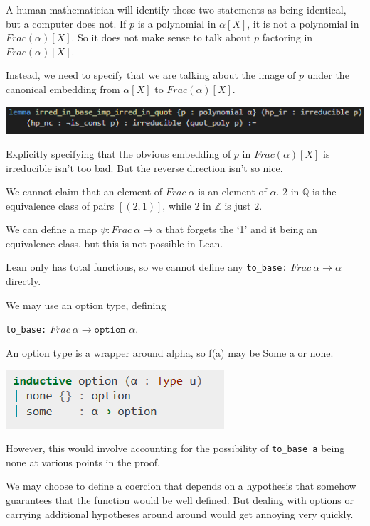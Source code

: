 \documentclass[pagesize=a4]{scrreprt}
\newcommand{\Z}{\mathbb{Z}}
\newcommand{\Q}{\mathbb{Q}}
\begin{document}
A human mathematician will identify those two statements as being identical, but a computer does not. If $p$ is a polynomial in $\alpha[X]$, it is not a polynomial in $Frac(\alpha)[X]$. So it does not make sense to talk about $p$ factoring in $Frac(\alpha)[X]$. 

Instead, we need to specify that we are talking about the image of $p$ under the canonical embedding from $\alpha[X]$ to $Frac(\alpha)[X]$. 


\includegraphics[width=\textwidth]{gauss_fwd.png}
  
  Explicitly specifying that the obvious embedding of $p$ in $Frac (\alpha) [X]$ is irreducible isn't too bad. But the reverse direction isn't so nice. 
  
  We cannot claim that an element of $Frac\ \alpha$ is an element of $\alpha$. 2 in $\Q$ is the equivalence class of pairs $[(2,1)]$, while $2$ in $\Z$ is just $2$. 
 
We can define a map $\psi : Frac\ \alpha \rightarrow \alpha$ that forgets the `1' and it being an equivalence class, but this is not possible in Lean.

    Lean only has total functions, so we cannot define any \texttt{to\_base:} $Frac\ \alpha \rightarrow \alpha$ directly. 
    
    We may use an option type, defining 

    \texttt{to\_base:} $Frac\ \alpha \rightarrow \texttt{option } \alpha$. 

    An option type is a wrapper around alpha, so f(a) may be Some a or none. 


    \includegraphics[]{option.png}

    However, this would involve accounting for the possibility of \texttt{to\_base a} being none at various points in the proof. 

    We may choose to define a coercion that depends on a hypothesis that somehow guarantees that the function would be well defined.   But dealing with options or carrying additional hypotheses around around would get annoying very quickly.
\end{document}
